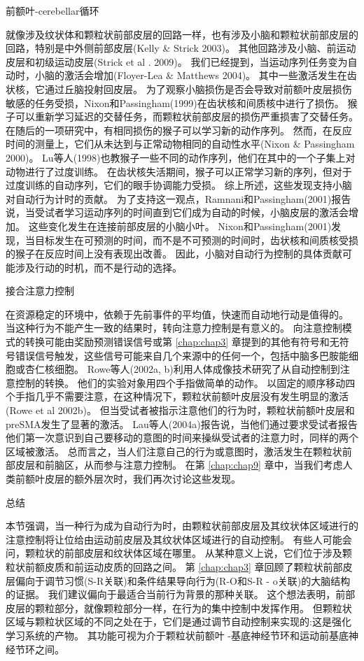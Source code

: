 前额叶-cerebellar循环

就像涉及纹状体和颗粒状前部皮层的回路一样，也有涉及小脑和颗粒状前部皮层的回路，特别是中外侧前部皮层(Kelly \& Strick 2003)。
其他回路涉及小脑、前运动皮层和初级运动皮层(Strick et al . 2009)。
我们已经提到，当运动序列任务变为自动时，小脑的激活会增加(Floyer-Lea \& Matthews 2004)。
其中一些激活发生在齿状核，它通过丘脑投射回皮层。
为了观察小脑损伤是否会导致对前额叶皮层损伤敏感的任务受损，Nixon和Passingham(1999)在齿状核和间质核中进行了损伤。
猴子可以重新学习延迟的交替任务，而颗粒状前部皮层的损伤严重损害了交替任务。
在随后的一项研究中，有相同损伤的猴子可以学习新的动作序列。
然而，在反应时间的测量上，它们从未达到与正常动物相同的自动性水平(Nixon \& Passingham 2000)。
Lu等人(1998)也教猴子一些不同的动作序列，他们在其中的一个子集上对动物进行了过度训练。
在齿状核失活期间，猴子可以正常学习新的序列，但对于过度训练的自动序列，它们的眼手协调能力受损。
综上所述，这些发现支持小脑对自动行为计时的贡献。
为了支持这一观点，Ramnani和Passingham(2001)报告说，当受试者学习运动序列的时间直到它们成为自动的时候，小脑皮层的激活会增加。
这些变化发生在连接前部皮层的小脑小叶。
Nixon和Passingham(2001)发现，当目标发生在可预测的时间，而不是不可预测的时间时，齿状核和间质核受损的猴子在反应时间上没有表现出改善。
因此，小脑对自动行为控制的具体贡献可能涉及行动的时机，而不是行动的选择。



接合注意力控制

在资源稳定的环境中，依赖于先前事件的平均值，快速而自动地行动是值得的。
当这种行为不能产生一致的结果时，转向注意力控制是有意义的。
向注意控制模式的转换可能由奖励预测错误信号或第 \ref{chap:chap3} 章提到的其他有符号和无符号错误信号触发，这些信号可能来自几个来源中的任何一个，包括中脑多巴胺能细胞或杏仁核细胞。
Rowe等人(2002a, b)利用人体成像技术研究了从自动控制到注意控制的转换。
他们的实验对象用四个手指做简单的动作。
以固定的顺序移动四个手指几乎不需要注意，在这种情况下，颗粒状前额叶皮层没有发生明显的激活(Rowe et al 2002b)。
但当受试者被指示注意他们的行为时，颗粒状前额叶皮层和preSMA发生了显著的激活。
Lau等人(2004a)报告说，当他们通过要求受试者报告他们第一次意识到自己要移动的意图的时间来操纵受试者的注意力时，同样的两个区域被激活。
总而言之，当人们注意自己的行为或意图时，激活发生在颗粒状前部皮层和前脑区，从而参与注意力控制。
在第 \ref{chap:chap9} 章中，当我们考虑人类前额叶皮层的额外层次时，我们再次讨论这些发现。



总结

本节强调，当一种行为成为自动行为时，由颗粒状前部皮层及其纹状体区域进行的注意控制将让位给由运动前皮层及其纹状体区域进行的自动控制。
有些人可能会问，颗粒状的前部皮层和纹状体区域在哪里。
从某种意义上说，它们位于涉及颗粒状前额皮质和前运动皮质的回路之间。
第 \ref{chap:chap3} 章回顾了颗粒状前部皮层偏向于调节习惯(S-R关联)和条件结果导向行为(R-O和S-R - o关联)的大脑结构的证据。
我们建议偏向于最适合当前行为背景的那种关联。
这个想法表明，前部皮层的颗粒部分，就像颗粒部分一样，在行为的集中控制中发挥作用。
但颗粒状区域与颗粒状区域的不同之处在于，它们是通过调节自动控制来实现的:这是强化学习系统的产物。
其功能可视为介于颗粒状前额叶 -基底神经节环和运动前基底神经节环之间。



